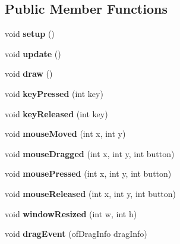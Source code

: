\subsection*{Public Member Functions}
\begin{DoxyCompactItemize}
\item 
\mbox{\label{classof_app_af68eaa1366244f7a541cd08e02199c12}} 
void {\bfseries setup} ()
\item 
\mbox{\label{classof_app_afef41ea4aee5a22ea530afba33ae7a7b}} 
void {\bfseries update} ()
\item 
\mbox{\label{classof_app_a75dd45437b9e317db73d8daef1ad49f8}} 
void {\bfseries draw} ()
\item 
\mbox{\label{classof_app_a957d3197364bbac8e67eaa4f15b28ad3}} 
void {\bfseries key\+Pressed} (int key)
\item 
\mbox{\label{classof_app_aa1503a87453bcfdd395fe4acca5d91a0}} 
void {\bfseries key\+Released} (int key)
\item 
\mbox{\label{classof_app_a158b41a606310db4633fdb817b21047c}} 
void {\bfseries mouse\+Moved} (int x, int y)
\item 
\mbox{\label{classof_app_a1ec53d1be799dc275806ff6c6548cd83}} 
void {\bfseries mouse\+Dragged} (int x, int y, int button)
\item 
\mbox{\label{classof_app_a2c2ea9c160231e55424dfd98466ef27d}} 
void {\bfseries mouse\+Pressed} (int x, int y, int button)
\item 
\mbox{\label{classof_app_aa3131f1554fc49eaa9ee0f284e48129b}} 
void {\bfseries mouse\+Released} (int x, int y, int button)
\item 
\mbox{\label{classof_app_ae4dc1ec1513dcbe48bc78a5e4c3fac0f}} 
void {\bfseries window\+Resized} (int w, int h)
\item 
\mbox{\label{classof_app_aada5a79556321801567752a0e5a69bda}} 
void {\bfseries drag\+Event} (of\+Drag\+Info drag\+Info)

\end{DoxyCompactItemize}
